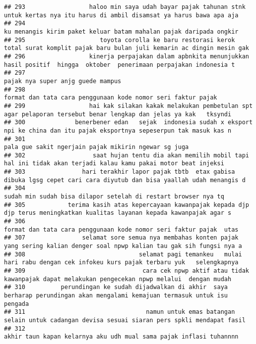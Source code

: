 \documentclass[
]{article}
\begin{document}
\begin{verbatim}
## 293                  haloo min saya udah bayar pajak tahunan stnk untuk kertas nya itu harus di ambil disamsat ya harus bawa apa aja
## 294                                                               ku menangis kirim paket keluar batam mahalan pajak daripada ongkir
## 295                     toyota corolla ke baru restorasi kerok total surat komplit pajak baru bulan juli kemarin ac dingin mesin gak
## 296                  kinerja perpajakan dalam apbnkita menunjukkan hasil positif  hingga  oktober  penerimaan perpajakan indonesia t
## 297                                                                                               pajak nya super anjg guede mampus 
## 298                                                                    format dan tata cara penggunaan kode nomor seri faktur pajak 
## 299                  hai kak silakan kakak melakukan pembetulan spt agar pelaporan tersebut benar lengkap dan jelas ya kak   tksyndi
## 300              benerbener edan   sejak  indonesia sudah x eksport npi ke china dan itu pajak eksportnya sepeserpun tak masuk kas n
## 301                                                                            pala gue sakit ngerjain pajak mikirin ngewar sg juga 
## 302                   saat hujan tentu dia akan memilih mobil tapi hal ini tidak akan terjadi kalau kamu pakai motor beat injeksi   
## 303                hari terakhir lapor pajak tbtb  etax gabisa dibuka lgsg cepet cari cara diyutub dan bisa yaallah udah menangis d 
## 304                                                                   sudah min sudah bisa dilapor setelah di restart browser nya tq
## 305            terima kasih atas kepercayaan kawanpajak kepada djp  djp terus meningkatkan kualitas layanan kepada kawanpajak agar s
## 306                                                              format dan tata cara penggunaan kode nomor seri faktur pajak  utas 
## 307                selamat sore semua nya membahas konten pajak yang sering kalian denger soal npwp kalian tau gak sih fungsi nya a 
## 308                                selamat pagi temankeu   mulai hari rabu dengan cek infokeu kurs pajak terbaru yuk   selengkapnya 
## 309                                 cara cek npwp aktif atau tidak  kawanpajak dapat melakukan pengecekan npwp melalui  dengan mudah
## 310          perundingan ke sudah dijadwalkan di akhir  saya berharap perundingan akan mengalami kemajuan termasuk untuk isu pengada
## 311                                  namun untuk emas batangan selain untuk cadangan devisa sesuai siaran pers spkli mendapat fasil 
## 312                                                              akhir taun kapan kelarnya aku udh mual sama pajak inflasi tuhannnn 

\end{verbatim}
\end{document}
